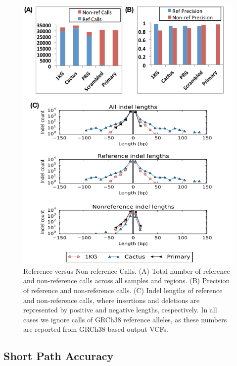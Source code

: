 \begin{figure}[htbp]
\centering
\includegraphics[width=\textwidth]{figures/04_bakeoff/figure05.png}
\caption[Reference versus Non-reference Calls]{Reference versus Non-reference Calls. (A) Total number of
reference and non-reference calls across all samples and regions. (B)
Precision of reference and non-reference calls. (C) Indel lengths of
reference and non-reference calls, where insertions and deletions are
represented by positive and negative lengths, respectively. In all cases
we ignore calls of GRCh38 reference alleles, as these numbers are
reported from GRCh38-based output VCFs.}
\label{fig:bakeoff:refnonref}
\end{figure}

\subsection{Short Path Accuracy}

